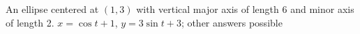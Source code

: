 {An ellipse centered at $(1,3)$ with vertical major axis of length 6 and minor axis of length 2.
}
{$x=\cos t+1$, $y=3\sin t +3$; other answers possible
}